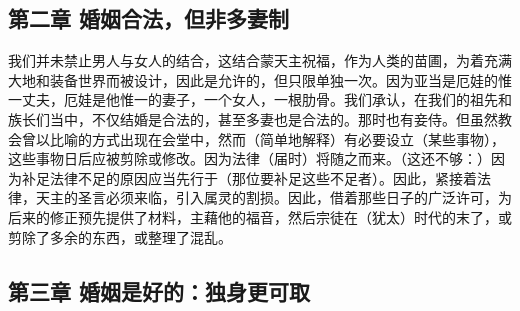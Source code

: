 
\subsection{第二章 婚姻合法，但非多妻制}

我们并未禁止男人与女人的结合，这结合蒙天主祝福，作为人类的苗圃，为着充满大地和装备世界而被设计，因此是允许的，但只限单独一次。因为亚当是厄娃的惟一丈夫，厄娃是他惟一的妻子，一个女人，一根肋骨。我们承认，在我们的祖先和族长们当中，不仅结婚是合法的，甚至多妻也是合法的。那时也有妾侍。但虽然教会曾以比喻的方式出现在会堂中，然而（简单地解释）有必要设立（某些事物），这些事物日后应被剪除或修改。因为法律（届时）将随之而来。（这还不够：）因为补足法律不足的原因应当先行于（那位要补足这些不足者）。因此，紧接着法律，天主的圣言必须来临，引入属灵的割损。因此，借着那些日子的广泛许可，为后来的修正预先提供了材料，主藉他的福音，然后宗徒在（犹太）时代的末了，或剪除了多余的东西，或整理了混乱。\par


\subsection{第三章 婚姻是好的：独身更可取}

